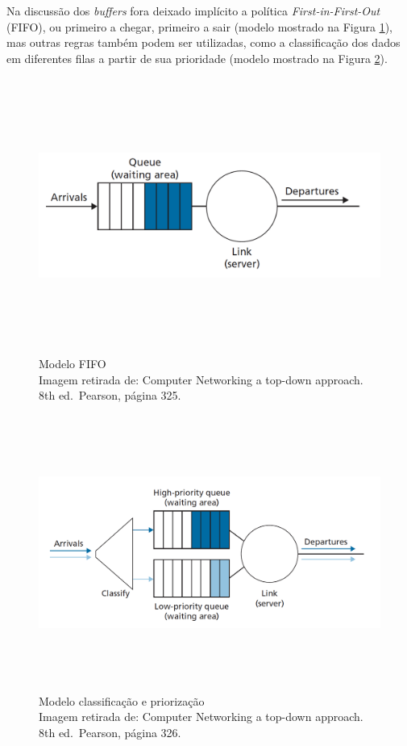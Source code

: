 Na discussão dos \emph{buffers} fora deixado implícito a política
\emph{First-in-First-Out} (FIFO), ou primeiro a chegar, primeiro a sair
(modelo mostrado na Figura \ref{fig:Modelo FIFO}), mas outras regras também podem ser
utilizadas, como a classificação dos dados em diferentes filas a partir
de sua prioridade (modelo mostrado na Figura \ref{fig:Modelo classificação e priorização}).


\begin{figure}[h!]
\centering
\includegraphics[keepaspectratio, width=12cm, height=9cm]{imagens/14/14 - FIFO.png}
\caption{Modelo FIFO \\
Imagem retirada de: Computer Networking a top-down approach. 8th
ed.~Pearson, página 325. \\}
\label{fig:Modelo FIFO}
\end{figure}




\begin{figure}[h!]
\centering
\includegraphics[keepaspectratio, width=12cm, height=9cm]{imagens/14/14 - priority queue.png}
\caption{Modelo classificação e priorização \\
Imagem retirada de: Computer Networking a top-down approach. 8th
ed.~Pearson, página 326. \\}
\label{fig:Modelo classificação e priorização}
\end{figure}

